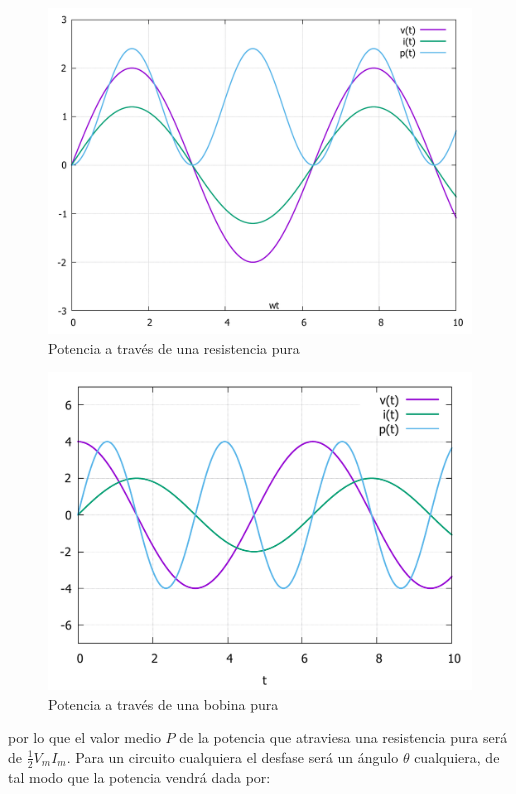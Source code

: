\documentclass[12pt]{article}
\begin{document}
\begin{figure}[h!] \centering
\includegraphics[scale=0.3]{potenciaresistencia.pdf}
\caption{Potencia a través de una resistencia pura}
\end{figure}

\begin{figure}[h!] \centering
\includegraphics[scale=0.4]{potenciainduccion.pdf}
\caption{Potencia a través de una bobina pura}
\end{figure}



por lo que el valor medio $P$ de la potencia que atraviesa una resistencia pura será de $\frac{1}{2} V_m I_m$. Para un circuito cualquiera el desfase será un ángulo $\theta$ cualquiera, de tal modo que la potencia vendrá dada por:
\end{document}
